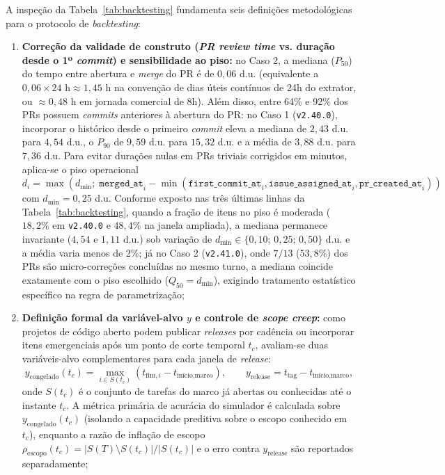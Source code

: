 \documentclass[12pt,openany,oneside,a4paper,english,brazilian,sumario=tradicional]{abntex2}
\begin{document}
A inspeção da Tabela~\ref{tab:backtesting} fundamenta seis definições metodológicas para o protocolo de \textit{backtesting}:

\begin{enumerate}
  \item \textbf{Correção da validade de construto (\textit{PR review time} vs. duração desde o 1º \textit{commit}) e sensibilidade ao piso:} no Caso 2, a mediana ($P_{50}$) do tempo entre abertura e \textit{merge} do PR é de $0{,}06$ d.u. (equivalente a $0{,}06 \times 24\text{ h} \approx 1{,}45\text{ h}$ na convenção de dias úteis contínuos de 24h do extrator, ou $\approx 0{,}48\text{ h}$ em jornada comercial de 8h). Além disso, entre 64\% e 92\% dos PRs possuem \textit{commits} anteriores à abertura do PR: no Caso 1 (\texttt{v2.40.0}), incorporar o histórico desde o primeiro \textit{commit} eleva a mediana de $2{,}43$ d.u. para $4{,}54$ d.u., o $P_{90}$ de $9{,}59$ d.u. para $15{,}32$ d.u. e a média de $3{,}88$ d.u. para $7{,}36$ d.u. Para evitar durações nulas em PRs triviais corrigidos em minutos, aplica-se o piso operacional $d_i = \max(d_{\min};\; \texttt{merged\_at}_i - \min(\texttt{first\_commit\_at}_i, \texttt{issue\_assigned\_at}_i, \texttt{pr\_created\_at}_i))$ com $d_{\min}=0{,}25$ d.u. Conforme exposto nas três últimas linhas da Tabela~\ref{tab:backtesting}, quando a fração de itens no piso é moderada ($18{,}2\%$ em \texttt{v2.40.0} e $48{,}4\%$ na janela ampliada), a mediana permanece invariante ($4{,}54$ e $1{,}11$ d.u.) sob variação de $d_{\min} \in \{0{,}10;\,0{,}25;\,0{,}50\}$ d.u. e a média varia menos de $2\%$; já no Caso 2 (\texttt{v2.41.0}), onde $7/13$ ($53{,}8\%$) dos PRs são micro-correções concluídas no mesmo turno, a mediana coincide exatamente com o piso escolhido ($Q_{50} = d_{\min}$), exigindo tratamento estatístico específico na regra de parametrização;
  \item \textbf{Definição formal da variável-alvo $y$ e controle de \textit{scope creep}:} como projetos de código aberto podem publicar \textit{releases} por cadência ou incorporar itens emergenciais após um ponto de corte temporal $t_c$, avaliam-se duas variáveis-alvo complementares para cada janela de \textit{release}:
  \begin{equation}
  y_{\mathrm{congelado}}(t_c) = \max_{i \in S(t_c)} \left(t_{\mathrm{fim},i} - t_{\text{início,marco}}\right), \qquad y_{\mathrm{release}} = t_{\mathrm{tag}} - t_{\text{início,marco}},
  \end{equation}
  onde $S(t_c)$ é o conjunto de tarefas do marco já abertas ou conhecidas até o instante $t_c$. A métrica primária de acurácia do simulador é calculada sobre $y_{\mathrm{congelado}}(t_c)$ (isolando a capacidade preditiva sobre o escopo conhecido em $t_c$), enquanto a razão de inflação de escopo $\rho_{\mathrm{escopo}}(t_c) = |S(T) \setminus S(t_c)| / |S(t_c)|$ e o erro contra $y_{\mathrm{release}}$ são reportados separadamente;

\end{enumerate}
\end{document}
